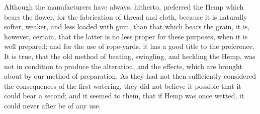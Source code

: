 \documentclass[a4paper, 11pt, oneside, polutonikogreek, english]{article}
\begin{document}
Although the manufacturers have always, hitherto, preferred the Hemp which bears the flower, for the fabrication of thread and cloth, because it is naturally softer, weaker, and less loaded with gum, than that which bears the grain, it is, however, certain, that the latter is no less proper for these purposes, when it is well prepared; and for the use of rope-yards, it has a good title to the preference. It is true, that the old method of beating, swingling, and heckling the Hemp, was not in condition to produce the alteration, and the effects, which are brought about by our method of preparation. As they had not then sufficiently considered the consequences of the first watering, they did not believe it possible that it could bear a second; and it seemed to them, that if Hemp was once wetted, it could never after be of any use.
\end{document}
